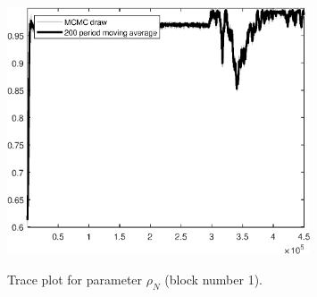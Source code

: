 \begin{figure}[H]
\centering
  \includegraphics[width=0.8\textwidth]{BRS_sectoral_wo_vcu/graphs/TracePlot_rho_N_blck_1}\\
    \caption{Trace plot for parameter ${\rho_N}$ (block number 1).}
\end{figure}
